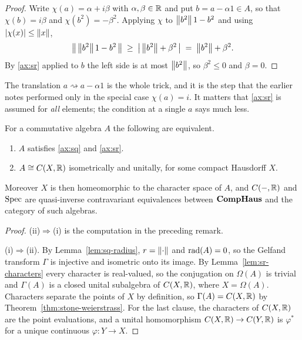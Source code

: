 \begin{proof}
Write $\chi(a)=\alpha+i\beta$ with $\alpha,\beta\in\mathbb{R}$ and put
$b=a-\alpha1\in A$, so that $\chi(b)=i\beta$ and $\chi(b^2)=-\beta^2$.  Applying
$\chi$ to $\left\lVert b^2\right\rVert1-b^2$ and using $\left\lvert\chi(x)\right\rvert\le\left\lVert x\right\rVert$,
\[
  \bigl\lVert\,\left\lVert b^2\right\rVert1-b^2\,\bigr\rVert
  \;\ge\;\bigl\lvert\,\left\lVert b^2\right\rVert+\beta^2\,\bigr\rvert
  \;=\;\left\lVert b^2\right\rVert+\beta^2 .
\]
By \eqref{ax:sr} applied to $b$ the left side is at most $\left\lVert b^2\right\rVert$, so
$\beta^2\le0$ and $\beta=0$.
\end{proof}

\begin{remark}
The translation $a\rightsquigarrow a-\alpha1$ is the whole trick, and it is the
step that the earlier notes performed only in the special case $\chi(a)=i$.  It
matters that \eqref{ax:sr} is assumed for \emph{all} elements; the condition at
a single $a$ says much less.
\end{remark}

\begin{theorem}\label{thm:gelfand}
For a commutative algebra $A$ the following are equivalent.
\begin{enumerate}
\item[(i)] $A$ satisfies \eqref{ax:sq} and \eqref{ax:sr}.
\item[(ii)] $A\cong C(X,\mathbb{R})$ isometrically and unitally, for some compact
  Hausdorff $X$.
\end{enumerate}
Moreover $X$ is then homeomorphic to the character space of $A$, and
$C(-,\mathbb{R})$ and $\operatorname{Spec}$ are quasi-inverse contravariant equivalences between
$\mathbf{CompHaus}$ and the category of such algebras.
\end{theorem}

\begin{proof}
(ii)$\Rightarrow$(i) is the computation in the preceding remark.

(i)$\Rightarrow$(ii).  By Lemma~\ref{lem:sq-radius}, $r=\left\lVert\cdot\right\rVert$ and
$\operatorname{rad}(A)=0$, so the Gelfand transform $\Gamma$ is injective and isometric onto
its image.  By Lemma~\ref{lem:sr-characters} every character is real-valued, so
the conjugation on $\Omega(A)$ is trivial and $\Gamma(A)$ is a closed unital
subalgebra of $C(X,\mathbb{R})$, where $X=\Omega(A)$.  Characters separate the points
of $X$ by definition, so $\Gamma(A)=C(X,\mathbb{R})$ by
Theorem~\ref{thm:stone-weierstrass}.  For the last clause, the characters of
$C(X,\mathbb{R})$ are the point evaluations, and a unital homomorphism
$C(X,\mathbb{R})\to C(Y,\mathbb{R})$ is $\varphi^*$ for a unique continuous
$\varphi:Y\to X$.
\end{proof}

